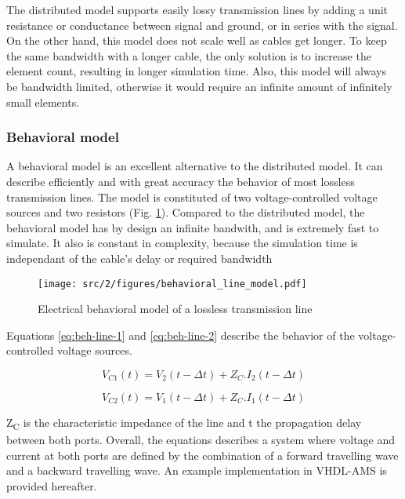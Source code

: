 The distributed model supports easily lossy transmission lines by adding a unit resistance or conductance between signal and ground, or in series with the signal.
On the other hand, this model does not scale well as cables get longer.
To keep the same bandwidth with a longer cable, the only solution is to increase the element count, resulting in longer simulation time.
Also, this model will always be bandwidth limited, otherwise it would require an infinite amount of infinitely small elements.

\subsubsection{Behavioral model}

A behavioral model is an excellent alternative to the distributed model.
It can describe efficiently and with great accuracy the behavior of most lossless transmission lines.
The model is constituted of two voltage-controlled voltage sources and two resistors (Fig. \ref{fig:beh-line-model}).
Compared to the distributed model, the behavioral model has by design an infinite bandwith, and is extremely fast to simulate.
It also is constant in complexity, because the simulation time is independant of the cable's delay or required bandwidth

\begin{figure}[!h]
  \centering
  \texttt{[image: src/2/figures/behavioral\_line\_model.pdf]}
  \caption{Electrical behavioral model of a lossless transmission line}
  \label{fig:beh-line-model}
\end{figure}

Equations \ref{eq:beh-line-1} and \ref{eq:beh-line-2} describe the behavior of the voltage-controlled voltage sources.

\begin{equation}
V_{C1}(t) = V_{2}(t - \Delta t) + Z_{C}.I_{2}(t - \Delta t)
\label{eq:beh-line-1}
\end{equation}

\begin{equation}
V_{C2}(t) = V_{1}(t - \Delta t) + Z_{C}.I_{1}(t - \Delta t)
\label{eq:beh-line-2}
\end{equation}

Z\textsubscript{C} is the characteristic impedance of the line and \textDelta{}t the propagation delay between both ports.
Overall, the equations describes a system where voltage and current at both ports are defined by the combination of a forward travelling wave and a backward travelling wave.
An example implementation in VHDL-AMS is provided hereafter.

